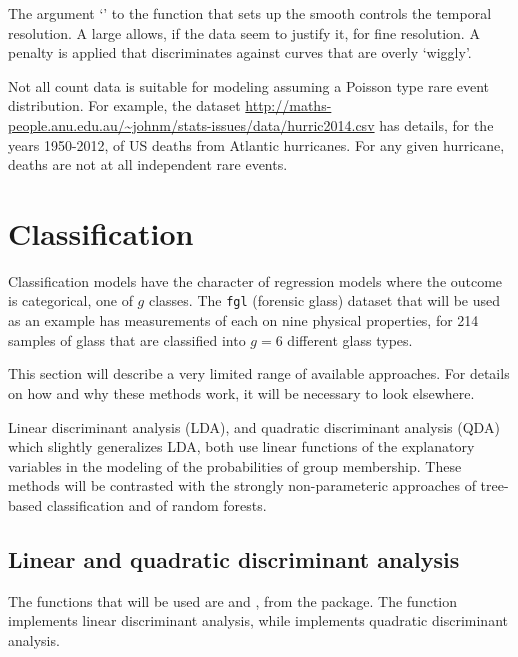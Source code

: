 The argument `' to the function  that sets up the
smooth controls the temporal resolution.  A large  allows,
if the data seem to justify it, for fine resolution. A penalty is
applied that discriminates against curves that are overly `wiggly'.

Not all count data is suitable for modeling assuming a Poisson type
rare event distribution. For example, the dataset
\url{http://maths-people.anu.edu.au/~johnm/stats-issues/data/hurric2014.csv}
has details, for the years 1950-2012, of US deaths from Atlantic
hurricanes.  For any given hurricane, deaths are not at all independent
rare events.

\section{Classification}

Classification models 
have the character of regression models where
the outcome is categorical, one of $g$ classes.  The
\texttt{fgl} (forensic glass) dataset that will be used as an example
has measurements of each on nine physical properties, for 214 samples
of glass that are classified into $g=6$ different glass types.  

This section will describe a very limited range of available
approaches.  For details
on how and why these methods work, it will be necessary to look
elsewhere.

Linear discriminant analysis (LDA), and quadratic
discriminant analysis (QDA) which slightly generalizes LDA,
both use linear functions of the explanatory variables in the
modeling of the probabilities of group membership.  These
methods will be contrasted with the strongly non-parameteric
approaches of tree-based classification and of random forests.

\subsection*{Linear and quadratic discriminant analysis}

The functions that will be used are 
and , from the  package.  The function
 implements linear discriminant analysis, while
 implements quadratic discriminant analysis.

